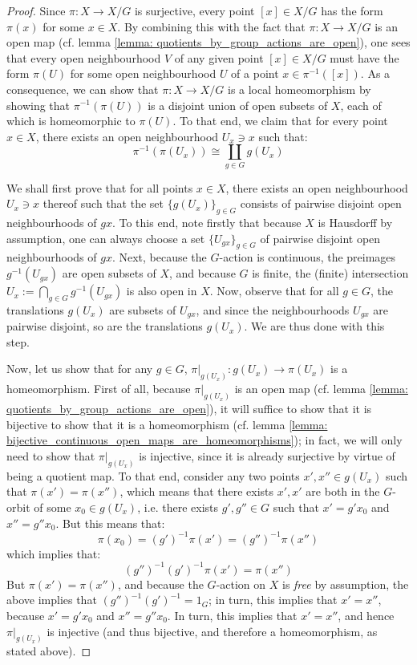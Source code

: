                 \begin{proof}
                    Since $\pi: X \to X/G$ is surjective, every point $[x] \in X/G$ has the form $\pi(x)$ for some $x \in X$. By combining this with the fact that $\pi: X \to X/G$ is an open map (cf. lemma \ref{lemma: quotients_by_group_actions_are_open}), one sees that every open neighbourhood $V$ of any given point $[x] \in X/G$ must have the form $\pi(U)$ for some open neighbourhood $U$ of a point $x \in \pi^{-1}([x])$. As a consequence, we can show that $\pi: X \to X/G$ is a local homeomorphism by showing that $\pi^{-1}(\pi(U))$ is a disjoint union of open subsets of $X$, each of which is homeomorphic to $\pi(U)$. To that end, we claim that for every point $x \in X$, there exists an open neighbourhood $U_x \ni x$ such that:
                        $$\pi^{-1}(\pi(U_x)) \cong \coprod_{g \in G} g(U_x)$$
                    
                    We shall first prove that for all points $x \in X$, there exists an open neighbourhood $U_x \ni x$ thereof such that the set $\{g(U_x)\}_{g \in G}$ consists of pairwise disjoint open neighbourhoods of $gx$. To this end, note firstly that because $X$ is Hausdorff by assumption, one can always choose a set $\{U_{gx}\}_{g \in G}$ of pairwise disjoint open neighbourhoods of $gx$. Next, because the $G$-action is continuous, the preimages $g^{-1}(U_{gx})$ are open subsets of $X$, and because $G$ is finite, the (finite) intersection $U_x := \bigcap_{g \in G} g^{-1}(U_{gx})$ is also open in $X$. Now, observe that for all $g \in G$, the translations $g(U_x)$ are subsets of $U_{gx}$, and since the neighbourhoods $U_{gx}$ are pairwise disjoint, so are the translations $g(U_x)$. We are thus done with this step.
                        
                    Now, let us show that for any $g \in G$, $\pi|_{g(U_x)}: g(U_x) \to \pi(U_x)$ is a homeomorphism. First of all, because $\pi|_{g(U_x)}$ is an open map (cf. lemma \ref{lemma: quotients_by_group_actions_are_open}), it will suffice to show that it is bijective to show that it is a homeomorphism (cf. lemma \ref{lemma: bijective_continuous_open_maps_are_homeomorphisms}); in fact, we will only need to show that $\pi|_{g(U_x)}$ is injective, since it is already surjective by virtue of being a quotient map. To that end, consider any two points $x', x'' \in g(U_x)$ such that $\pi(x') = \pi(x'')$, which means that there exists $x', x'$ are both in the $G$-orbit of some $x_0 \in g(U_x)$, i.e. there exists $g', g'' \in G$ such that $x' = g' x_0$ and $x'' = g'' x_0$. But this means that:
                        $$\pi(x_0) = (g')^{-1}\pi(x') = (g'')^{-1}\pi(x'')$$
                    which implies that:
                        $$(g'')^{-1}(g')^{-1}\pi(x') = \pi(x'')$$
                    But $\pi(x') = \pi(x'')$, and because the $G$-action on $X$ is \textit{free} by assumption, the above implies that $(g'')^{-1}(g')^{-1} = 1_G$; in turn, this implies that $x' = x''$, because $x' = g' x_0$ and $x'' = g'' x_0$. In turn, this implies that $x' = x''$, and hence $\pi|_{g(U_x)}$ is injective (and thus bijective, and therefore a homeomorphism, as stated above).
                    

\end{proof}
